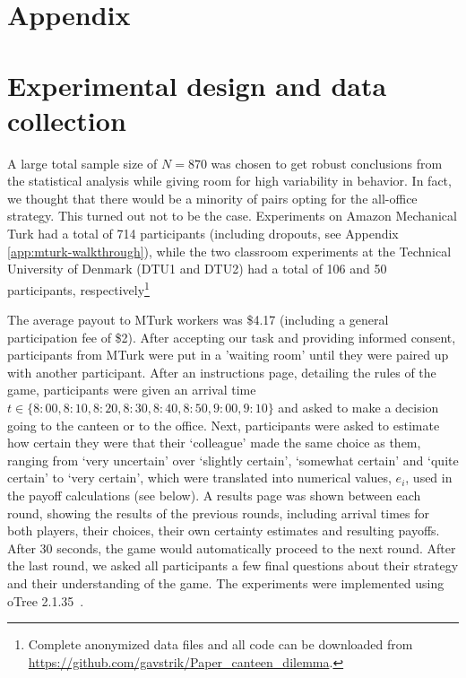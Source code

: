 \appendix

\section*{\centering Appendix} 



\section{Experimental design and data collection} A large total sample size of $N=870$ was chosen to get robust conclusions from the statistical analysis while giving room for high variability in behavior. In fact, we thought that there would be a minority of pairs
opting for the all-office strategy. This turned out not to be the case. Experiments on Amazon Mechanical Turk had a total of 714 participants (including dropouts, see Appendix \ref{app:mturk-walkthrough}), while the two classroom experiments at the Technical University of Denmark (DTU1 and DTU2) had a total of 106 and 50 participants, respectively\footnote{Complete anonymized data files and all code can be downloaded from \url{https://github.com/gavstrik/Paper_canteen_dilemma}.}

The average payout to MTurk workers was \$4.17 (including a general participation fee of \$2). After accepting our task and providing informed consent, participants from MTurk were put in a ’waiting room’ until they were paired up with another participant. After an instructions page, detailing the rules of the game, participants were given an arrival time $t \in \{8{:}00, 8{:}10, 8{:}20, 8{:}30, 8{:}40, 8{:}50, 9{:}00,9{:}10\}$ and asked to make a decision  going to the canteen or to the office. Next, participants were asked to estimate how certain they were that their `colleague' made the same choice as them, ranging from `very uncertain' over `slightly certain', `somewhat certain' and `quite certain' to `very certain', which were translated  into numerical values, $e_i$, used in the payoff calculations (see below). A results page was shown between each round, showing the results of the previous rounds, including arrival times for both players, their choices, their own certainty estimates and resulting payoffs. After 30 seconds, the game would automatically proceed to the next round. After the last round, we asked all participants a few final questions about their strategy and their understanding of the game. The experiments were implemented using oTree 2.1.35~\cite{ChenSchongerWickens16}.

